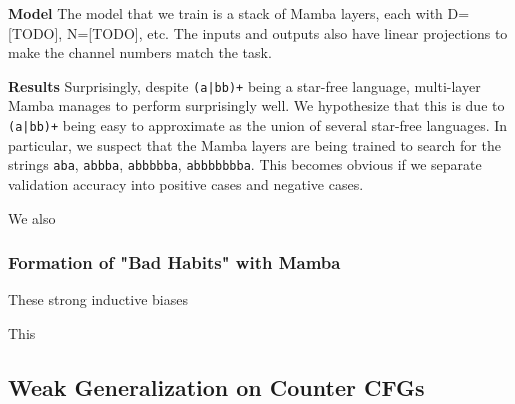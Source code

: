 \textbf{Model} The model that we train is a stack of Mamba layers, each with 
D=[TODO], N=[TODO], etc.
The inputs and outputs also have linear projections to make the channel numbers
match the task.

\textbf{Results} Surprisingly, despite \texttt{(a|bb)+} being a star-free
language, multi-layer Mamba manages to perform surprisingly well.
We hypothesize that this is due to \texttt{(a|bb)+} being easy to approximate
as the union of several star-free languages.
% 
In particular, we suspect that the Mamba layers are being trained to search for
the strings \texttt{aba}, \texttt{abbba}, \texttt{abbbbba}, \texttt{abbbbbbba}.
This becomes obvious if we separate validation accuracy into positive cases and
negative cases.

We also 



\subsubsection{Formation of "Bad Habits" with Mamba}
These strong inductive biases 


This 

\subsection{Weak Generalization on Counter CFGs}
